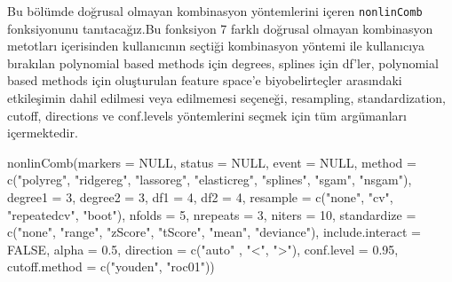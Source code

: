 \documentclass[]{article}
\newcommand{\hlnum}[1]{\textcolor[rgb]{0.816,0.125,0.439}{#1}}%
\newcommand{\hlstr}[1]{\textcolor[rgb]{0.251,0.627,0.251}{#1}}%
\newcommand{\hlstd}[1]{\textcolor[rgb]{0.251,0.251,0.251}{#1}}%
\newenvironment{Shaded}{\begin{myshaded}}{\end{myshaded}}
\newcommand{\DecValTok}[1]{\hlnum{#1}}
\newcommand{\FloatTok}[1]{\hlnum{#1}}
\newcommand{\ConstantTok}[1]{\hlnum{#1}}
\newcommand{\StringTok}[1]{\hlstr{#1}}
\newcommand{\FunctionTok}[1]{\hlstd{#1}}
\newcommand{\AttributeTok}[1]{{#1}}
\newcommand{\NormalTok}[1]{\hlstd{#1}}
\begin{document}
Bu bölümde doğrusal olmayan kombinasyon yöntemlerini içeren \texttt{nonlinComb} fonksiyonunu tanıtacağız.Bu fonksiyon 7 farklı doğrusal olmayan kombinasyon metotları içerisinden kullanıcının seçtiği kombinasyon yöntemi ile kullanıcıya bırakılan polynomial based methods için degrees, splines için df'ler, polynomial based methods için oluşturulan feature space'e biyobelirteçler arasındaki etkileşimin dahil edilmesi veya edilmemesi seçeneği, resampling, standardization, cutoff, directions ve conf.levels yöntemlerini seçmek için tüm argümanları içermektedir.

\begin{Shaded}
\begin{Highlighting}[]
\FunctionTok{nonlinComb}\NormalTok{(}\AttributeTok{markers =} \ConstantTok{NULL}\NormalTok{,}
           \AttributeTok{status =} \ConstantTok{NULL}\NormalTok{,}
           \AttributeTok{event =} \ConstantTok{NULL}\NormalTok{,}
           \AttributeTok{method =} \FunctionTok{c}\NormalTok{(}\StringTok{"polyreg"}\NormalTok{,}
                      \StringTok{"ridgereg"}\NormalTok{,}
                      \StringTok{"lassoreg"}\NormalTok{,}
                      \StringTok{"elasticreg"}\NormalTok{,}
                      \StringTok{"splines"}\NormalTok{,}
                      \StringTok{"sgam"}\NormalTok{,}
                       \StringTok{"nsgam"}\NormalTok{),}
           \AttributeTok{degree1 =} \DecValTok{3}\NormalTok{,}
           \AttributeTok{degree2 =} \DecValTok{3}\NormalTok{,}
           \AttributeTok{df1 =} \DecValTok{4}\NormalTok{,}
           \AttributeTok{df2 =} \DecValTok{4}\NormalTok{,}
           \AttributeTok{resample =} \FunctionTok{c}\NormalTok{(}\StringTok{"none"}\NormalTok{, }\StringTok{"cv"}\NormalTok{, }\StringTok{"repeatedcv"}\NormalTok{, }\StringTok{"boot"}\NormalTok{),}
           \AttributeTok{nfolds =} \DecValTok{5}\NormalTok{,}
           \AttributeTok{nrepeats =} \DecValTok{3}\NormalTok{,}
           \AttributeTok{niters =} \DecValTok{10}\NormalTok{,}
           \AttributeTok{standardize =} \FunctionTok{c}\NormalTok{(}\StringTok{"none"}\NormalTok{, }\StringTok{"range"}\NormalTok{, }\StringTok{"zScore"}\NormalTok{, }\StringTok{"tScore"}\NormalTok{, }
                           \StringTok{"mean"}\NormalTok{, }\StringTok{"deviance"}\NormalTok{),}
           \AttributeTok{include.interact =} \ConstantTok{FALSE}\NormalTok{,}
           \AttributeTok{alpha =} \FloatTok{0.5}\NormalTok{,}
           \AttributeTok{direction =} \FunctionTok{c}\NormalTok{(}\StringTok{"auto"}\NormalTok{ , }\StringTok{"\textless{}"}\NormalTok{, }\StringTok{"\textgreater{}"}\NormalTok{),}
           \AttributeTok{conf.level =} \FloatTok{0.95}\NormalTok{,}
           \AttributeTok{cutoff.method =} \FunctionTok{c}\NormalTok{(}\StringTok{"youden"}\NormalTok{, }\StringTok{"roc01"}\NormalTok{))}
\end{Highlighting}
\end{Shaded}
\end{document}
